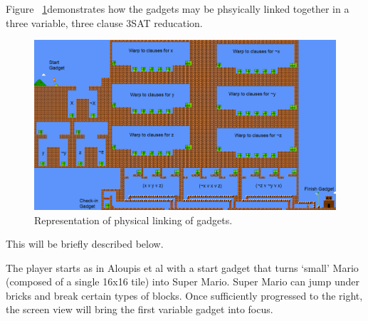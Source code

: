 \documentclass[11pt, a4paper, oneside]{report} %
\begin{document}





Figure ~\ref{full-level}demonstrates how the gadgets may be phsyically linked
together in a three variable, three clause 3SAT reducation.

\begin{figure}[ht!]

  \centering
    \includegraphics[scale=0.25]{fulllevel-text}
  \caption{Representation of physical linking of gadgets.}
  \label{full-level}
\end{figure}

This will be briefly described below.

The player starts as in Aloupis et al \cite{Aloupis2012} with a start gadget
that turns `small' Mario (composed of a single 16x16 tile) into Super Mario.
Super Mario can jump under bricks and break certain types of blocks. Once
sufficiently progressed to the right, the screen view will bring the first
variable gadget into focus.
\end{document}
